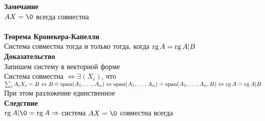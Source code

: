 \documentclass[12pt]{article}
\begin{document}
\textbf{Замечание}\\
$AX=\0$ всегда совместна\\\\
\textbf{Теорема Кронекера-Капелли}\\
Система совместна тогда и только тогда, когда $\operatorname{rg} A = \operatorname{rg} A|B$\\
\textbf{Доказательство}\\
Запишем систему в векторной форме\\
Система совместна $\Leftrightarrow \exists (X_i)$, что $\sum_i A_iX_i=B \Leftrightarrow B \in \operatorname{span}(A_1,\ldots, A_n) \Leftrightarrow \operatorname{span}(A_1,\ldots,A_n) = \operatorname{span}(A_1,\ldots,A_n,B) \Leftrightarrow \operatorname{rg} A = \operatorname{rg} A|B$\\
При этом разложение единственное\\
\textbf{Следствие}\\
$\rg A|\0 = \rg A \Rightarrow$ система $AX=\0$ совместна всегда
\end{document}
